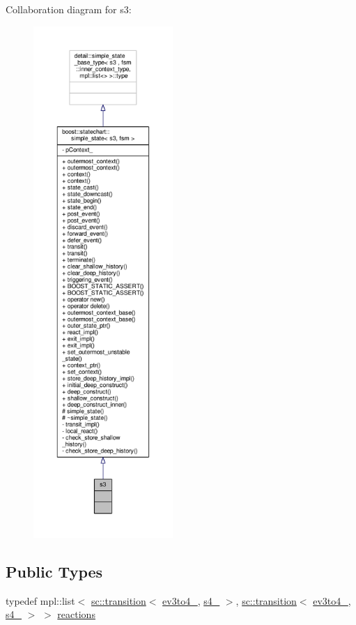 Collaboration diagram for s3\+:
\nopagebreak
\begin{figure}[H]
\begin{center}
\leavevmode
\includegraphics[height=550pt]{structs3__coll__graph}
\end{center}
\end{figure}
\subsection*{Public Types}
\begin{DoxyCompactItemize}
\item 
typedef mpl\+::list$<$ \mbox{\hyperlink{classboost_1_1statechart_1_1transition}{sc\+::transition}}$<$ \mbox{\hyperlink{structev3to4__1}{ev3to4\+\_}}, \mbox{\hyperlink{structs4__1}{s4\+\_}} $>$, \mbox{\hyperlink{classboost_1_1statechart_1_1transition}{sc\+::transition}}$<$ \mbox{\hyperlink{structev3to4__2}{ev3to4\+\_}}, \mbox{\hyperlink{structs4__2}{s4\+\_}} $>$ $>$ \mbox{\hyperlink{structs3_a8e624263baefdc4a05a3ccc89d5ae798}{reactions}}
\end{DoxyCompactItemize}
